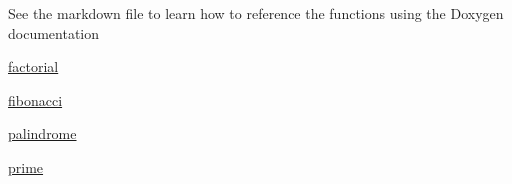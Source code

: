 \label{index_md__home_runner_work_CMake_Project_CMake_Project_docs_mainpage}%
%
 See the markdown file to learn how to reference the functions using the Doxygen documentation


\begin{DoxyItemize}
\item \mbox{\hyperlink{factorial_8h_ad6894889e84fd230aee384a49a5baec9}{factorial}}
\item \mbox{\hyperlink{fibonacci_8cpp_a707f85e64ca9c18ca4e14abd9e5437b3}{fibonacci}}
\item \mbox{\hyperlink{palindrome_8cpp_ad7f1bfb3ce4b40ad8e67cd7a16cba62c}{palindrome}}
\item \mbox{\hyperlink{prime_8cpp_a8f22bd7d29362267fee265fc0368816a}{prime}} 
\end{DoxyItemize}
